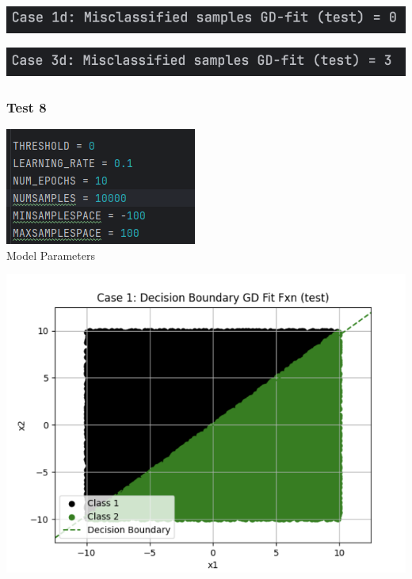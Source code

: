 \documentclass{article}
\begin{document}
\begin{center}
\includegraphics[scale=0.75]{../figs/T7.2.png} \\
\end{center}

\begin{center}
\includegraphics[scale=0.75]{../figs/T7.3.png} \\
\end{center}

\subsubsection{Test 8}

\begin{center}
\includegraphics[scale=0.75]{../figs/T4.1.png} \\
\caption{Model Parameters}
\end{center}

\begin{center}
\includegraphics[scale=0.75]{../figs/T8.1.png} \\
\end{center}
\end{document}

